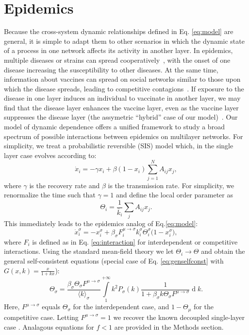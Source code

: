 \documentclass[pre,twocolumn,superscriptaddress]{revtex4}
\newcommand{\kk}{\bar{k}}
\DeclareMathOperator{\dd}{\mathrm{d}}
\newcommand{\1}{\mathds{1}}
\begin{document}
{\section{Epidemics}
Because the cross-system dynamic relationships defined in Eq. \eqref{eq:model} are general, it is simple to adapt them to other scenarios in which the dynamic state of a process in one network affects its activity in another layer.
In epidemics,  multiple diseases or strains can spread cooperatively~\cite{newman2013interacting,chen2013outbreaks,azimi2016cooperative}, with the onset of one disease increasing the susceptibility to other diseases. At the same time, information about vaccines can spread on social networks similar to those upon which the disease spreads, leading to competitive contagions~\cite{newman2005threshold,sanz2014dynamics,sahneh2014competitive}.  If exposure to the disease in one layer induces an individual to vaccinate in another layer, we may find that the disease layer enhances the vaccine layer, even as the vaccine layer suppresses the disease layer (the assymetric ``hybrid'' case of our model)~\cite{ahn2006epidemic}.  
 Our model of dynamic dependence offers a unified framework to study a broad spectrum of possible interactions between epidemics on multilayer networks.
For simplicity, we treat a probabilistic reversible (SIS) model which, in the single layer case evolves according to:
\begin{equation}\label{eq:modelSIS0}
\dot{x}_i=-\gamma x_i+\beta(1-x_i)\sum_{j=1}^N A_{ij}x_j,
\end{equation}
where $\gamma$ is the recovery rate and $\beta$ is the transmission rate.  For simplicity, we renormalize the time such that $\gamma = 1$ and define the local order parameter as 
\begin{equation}\label{eq:SISop}
\Theta_i = \frac{1}{\kk_i} \sum_j A_{ij} x_j.
\end{equation}
This immediately leads to the epidemics analog of Eq.\eqref{eq:model}:
\begin{equation}\label{eq:SISdep}
\dot{x}_i^\sigma=-x_i^\sigma+\beta_\sigma F_i^{\mu\to\sigma}k_i^\sigma\Theta_i^\sigma\big(1-x_i^\sigma\big),
\end{equation}
where $F_i$ is defined as in Eq. \eqref{eq:interaction} for interdependent or competitive interactions.
Using the standard mean-field theory \cite{pastorsatorras-prl2001} we let $\Theta_i \rightarrow \Theta$ and obtain the general self-consistent equations (special case of Eq. \eqref{eq:genselfconst} with $G(x,k) = \frac{x}{1 + kx}$):
\begin{equation}\label{eq:SISselfconst}
\Theta_\sigma=\frac{\beta_\sigma\Theta_\sigma F^{\mu\to\sigma}}{\langle k\rangle_\sigma}\int\limits_1^{+\infty}k^2 P_\sigma(k)\frac{ 1 }{1+\beta_\sigma k\Theta_\sigma F^{\mu\to\sigma}}\dd k.
\end{equation}
Here,  $F^{\mu\to\sigma}$ equals $\Theta_\sigma$ for the interdependent case, and $1 - \Theta_\mu$ for the competitive case.  Letting $F^{\mu\to\sigma} = 1$ we recover the known decoupled single-layer case  \cite{pastorsatorras-prl2001}.  Analagous equations for $f<1$ are provided in the Methods section.

}
\end{document}
